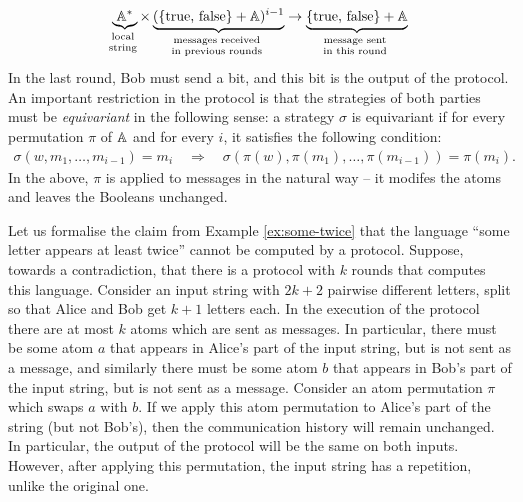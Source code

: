 \begin{align*}
\myunderbrace{\atoms^*}{local \\ string} \times \myunderbrace{(\set{\text{true, false}} + \atoms)^{i-1}}{messages received \\ in previous rounds} 
\to
\myunderbrace{\set{\text{true, false}} + \atoms}{message sent \\ in this round}
\end{align*}
In the last round, Bob must send a bit, and this bit is the output of the protocol.
An important restriction in the protocol is that the strategies of both parties must be \emph{equivariant} in the following sense: 
a strategy $\sigma$ is equivariant if for every permutation $\pi$ of $\mathbb A$ and for every $i$, it satisfies the following condition:
\begin{align*}
\sigma(w, m_1, \ldots, m_{i-1}) = m_i 
\quad \Rightarrow \quad
\sigma(\pi(w), \pi(m_1), \ldots, \pi(m_{i-1})) = \pi(m_i).
\end{align*}
In the above, $\pi$ is applied to messages in the natural way -- it modifes the atoms and leaves the Booleans unchanged.

\begin{myexample}
    Let us formalise the claim from Example \ref{ex:some-twice} that the language ``some letter appears at least twice'' cannot be computed by a protocol. Suppose, towards a contradiction, that there is a protocol with $k$ rounds that computes this language. Consider an input string with $2k+2$ pairwise different letters, split so that Alice and Bob get $k+1$ letters each. In the execution of the protocol there are at most $k$ atoms which are sent as messages. In particular, there must be some atom $a$ that appears in Alice's part of the input string, but is not sent as a message, and similarly there must be some atom $b$ that appears in Bob's part of the input string, but is not sent as a message. Consider an atom permutation $\pi$ which swaps $a$ with $b$. If we apply this atom permutation to Alice's part of the string (but not Bob's), then the communication history will remain unchanged. In particular, the output of the protocol will be the same on both inputs. However, after applying this permutation, the input string has a repetition, unlike the original one. 
\end{myexample}


